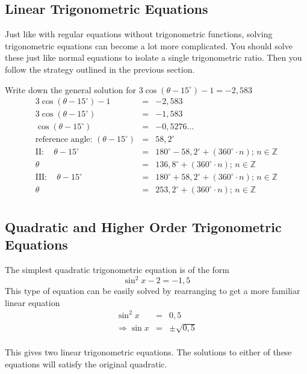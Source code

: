 \subsection{Linear Trigonometric Equations}
Just like with regular equations without trigonometric functions, solving trigonometric equations can become a lot more complicated. You should solve these just like normal equations to isolate a single trigonometric ratio. Then you follow the strategy outlined in the previous section.

\begin{wex}{}
{%
Write down the general solution for $3\cos(\theta - 15^\circ)-1 = -2,583$\\
}
{%
\begin{eqnarray*} 
3\cos(\theta-15^{\circ})-1 &=& -2,583 \\
3\cos(\theta-15^{\circ}) &=& -1,583\\ 
\cos(\theta-15^{\circ}) &=& -0,5276\ldots\\
\mbox{reference angle: }(\theta-15^{\circ}) &=& 58,2^{\circ}\\ 
\mathrm{II:} \quad \theta-15^{\circ}&=&180^{\circ}-58,2^{\circ}+(360^{\circ}\cdot n) \mbox{; }n\in\mathbb{Z} \\ 
\theta&=&136,8^{\circ}+(360^{\circ}\cdot n)\mbox{; } n \in \mathbb{Z} \\ 
\mathrm{III:} \quad \theta-15^{\circ}&=&180^{\circ}+58,2^{\circ}+(360^{\circ}\cdot n) \mbox{; } n\in\mathbb{Z} \\ 
\theta&=&253,2^{\circ}+(360^{\circ}\cdot n) \mbox{; } n \in \mathbb{Z} \\ 
\end{eqnarray*}
}
\end{wex}

\subsection{Quadratic and Higher Order Trigonometric Equations}
The simplest quadratic trigonometric equation is of the form
\[ \sin^2x-2=-1,5 \]
This type of equation can be easily solved by rearranging to get a more familiar linear equation
\begin{eqnarray*}
\sin^2x&=&0,5 \\
\Rightarrow \sin x&=&\pm\sqrt{0,5} \\
\end{eqnarray*}

This gives two linear trigonometric equations. The solutions to either of these equations will satisfy the original quadratic. 

